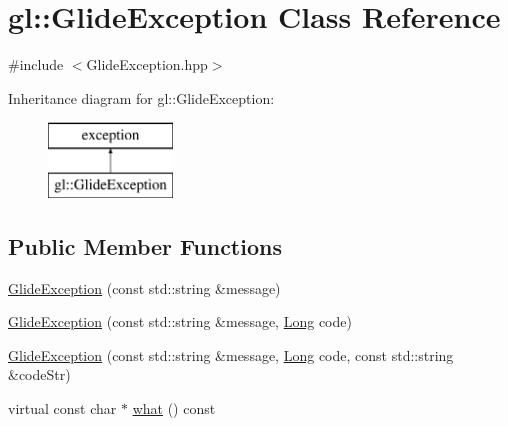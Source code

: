 \hypertarget{classgl_1_1_glide_exception}{\section{gl\-:\-:Glide\-Exception Class Reference}
\label{classgl_1_1_glide_exception}
}


{\ttfamily \#include $<$Glide\-Exception.\-hpp$>$}

Inheritance diagram for gl\-:\-:Glide\-Exception\-:\begin{figure}[H]
\begin{center}
\leavevmode
\includegraphics[height=2.000000cm]{classgl_1_1_glide_exception}
\end{center}
\end{figure}
\subsection*{Public Member Functions}
\begin{DoxyCompactItemize}
\item 
\hyperlink{classgl_1_1_glide_exception_aced3eebf8bbc7c3ece421aba2968eb08}{Glide\-Exception} (const std\-::string \&message)
\item 
\hyperlink{classgl_1_1_glide_exception_aeb51efa7265ec37545424eb14210348e}{Glide\-Exception} (const std\-::string \&message, \hyperlink{_basic_types_8hpp_a57ba1b89723b1138a6c560e57422acd5}{Long} code)
\item 
\hyperlink{classgl_1_1_glide_exception_a48c8b727d59aacc363f288f12fb178bb}{Glide\-Exception} (const std\-::string \&message, \hyperlink{_basic_types_8hpp_a57ba1b89723b1138a6c560e57422acd5}{Long} code, const std\-::string \&code\-Str)
\item 
virtual const char $\ast$ \hyperlink{classgl_1_1_glide_exception_a2c36fecffc35bb3c223a85b59f5322fe}{what} () const 
\end{DoxyCompactItemize}
